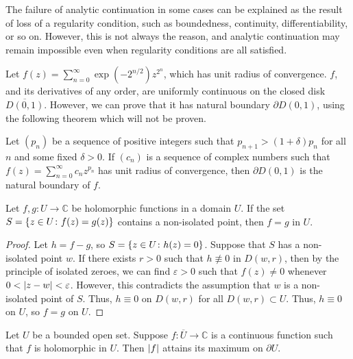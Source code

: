 The failure of analytic continuation in some cases can be explained as the result of loss of a regularity condition, such as boundedness, continuity, differentiability, or so on.
However, this is not always the reason, and analytic continuation may remain impossible even when regularity conditions are all satisfied.
\begin{example}
	Let \( f(z) = \sum_{n=0}^\infty \exp(-2^{n/2}) z^{2^n} \), which has unit radius of convergence.
	\( f \), and its derivatives of any order, are uniformly continuous on the closed disk \( \overline{D(0,1)} \).
	However, we can prove that it has natural boundary \( \partial D(0,1) \), using the following theorem which will not be proven.
	\begin{theorem}
		Let \( (p_n) \) be a sequence of positive integers such that \( p_{n+1} > (1+\delta)p_n \) for all \( n \) and some fixed \( \delta > 0 \).
		If \( (c_n) \) is a sequence of complex numbers such that \( f(z) = \sum_{n=0}^\infty c_n z^{p_n} \) has unit radius of convergence, then \( \partial D(0,1) \) is the natural boundary of \( f \).
	\end{theorem}
\end{example}
\begin{corollary}
	Let \( f, g \colon U \to \mathbb C \) be holomorphic functions in a domain \( U \).
	If the set \( S = \qty{z \in U \colon f(z) = g(z)} \) contains a non-isolated point, then \( f = g \) in \( U \).
\end{corollary}
\begin{proof}
	Let \( h = f - g \), so \( S = \qty{z \in U \colon h(z) = 0} \).
	Suppose that \( S \) has a non-isolated point \( w \).
	If there exists \( r > 0 \) such that \( h \not\equiv 0 \) in \( D(w,r) \), then by the principle of isolated zeroes, we can find \( \varepsilon > 0 \) such that \( f(z) \neq 0 \) whenever \( 0 < \abs{z-w} < \varepsilon \).
	However, this contradicts the assumption that \( w \) is a non-isolated point of \( S \).
	Thus, \( h \equiv 0 \) on \( D(w,r) \) for all \( D(w,r) \subset U \).
	Thus, \( h \equiv 0 \) on \( U \), so \( f = g \) on \( U \).
\end{proof}
\begin{corollary}
	Let \( U \) be a bounded open set.
	Suppose \( f \colon \overline U \to \mathbb C \) is a continuous function such that \( f \) is holomorphic in \( U \).
	Then \( \abs{f} \) attains its maximum on \( \partial U \).
\end{corollary}

